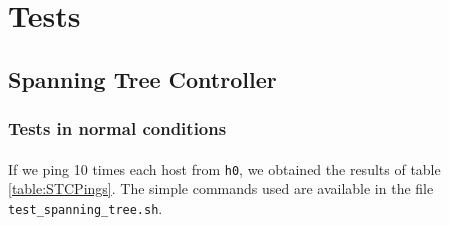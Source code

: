 \documentclass[a4paper, 11pt, oneside]{article}
\begin{document}
\section{Tests}

\subsection{Spanning Tree Controller}
\subsubsection{Tests in normal conditions}
\paragraph{}If we ping 10 times each host from \texttt{h0}, we obtained the results of table \ref{table:STCPings}. The simple commands used are available in the file \texttt{test\_spanning\_tree.sh}.\\
\end{document}
